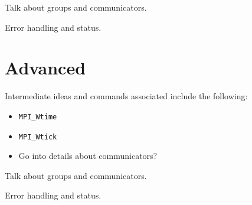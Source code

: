 Talk about groups and communicators.

Error handling and status.

\section{Advanced}

Intermediate ideas and commands associated include the following: \\
\begin{itemize}
\item \texttt{MPI\_Wtime}
\item \texttt{MPI\_Wtick}
\item Go into details about communicators?
\end{itemize}

Talk about groups and communicators.

Error handling and status.


